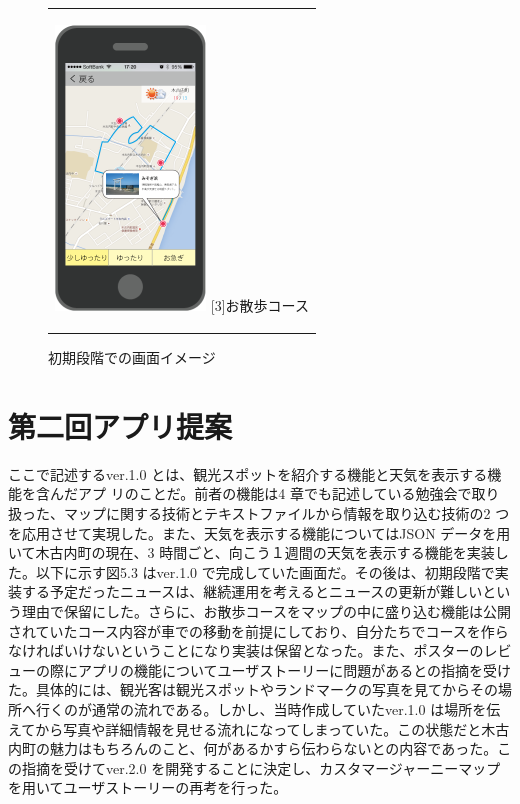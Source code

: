 \documentclass[openany,11pt,papersize]{jsbook}
\begin{document}
\begin{figure}[htbp]
\begin{center}
\begin{tabular}{c}
      \begin{minipage}{0.33\hsize}
        \begin{center}
\includegraphics[width=4cm, bb=0 0 302 572]{5.2_sanpo.png}
          \hspace{1cm} [3]お散歩コース
        \end{center}
      \end{minipage}

    \end{tabular}
    \caption{初期段階での画面イメージ}
    \label{fig:lena}
  \end{center}
\end{figure}

\section{第二回アプリ提案}
ここで記述するver.1.0 とは、観光スポットを紹介する機能と天気を表示する機能を含んだアプ
リのことだ。前者の機能は4 章でも記述している勉強会で取り扱った、マップに関する技術とテキストファイルから情報を取り込む技術の2 つを応用させて実現した。また、天気を表示する機能についてはJSON データを用いて木古内町の現在、3 時間ごと、向こう１週間の天気を表示する機能を実装した。以下に示す図5.3 はver.1.0 で完成していた画面だ。その後は、初期段階で実装する予定だったニュースは、継続運用を考えるとニュースの更新が難しいという理由で保留にした。さらに、お散歩コースをマップの中に盛り込む機能は公開されていたコース内容が車での移動を前提にしており、自分たちでコースを作らなければいけないということになり実装は保留となった。また、ポスターのレビューの際にアプリの機能についてユーザストーリーに問題があるとの指摘を受けた。具体的には、観光客は観光スポットやランドマークの写真を見てからその場所へ行くのが通常の流れである。しかし、当時作成していたver.1.0 は場所を伝えてから写真や詳細情報を見せる流れになってしまっていた。この状態だと木古内町の魅力はもちろんのこと、何があるかすら伝わらないとの内容であった。この指摘を受けてver.2.0 を開発することに決定し、カスタマージャーニーマップを用いてユーザストーリーの再考を行った。
\end{document}
